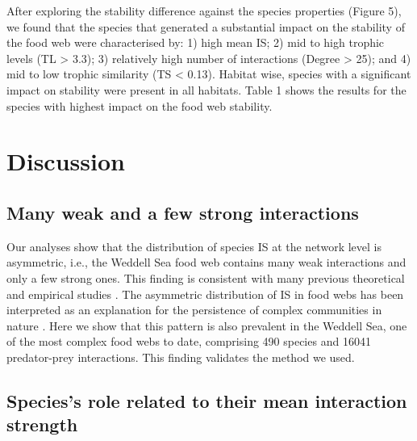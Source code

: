 \documentclass[gc, manuscript]{copernicus}
\begin{document}
After exploring the stability difference against the species properties
(Figure 5), we found that the species that generated a substantial
impact on the stability of the food web were characterised by: 1) high
mean IS; 2) mid to high trophic levels (TL \textgreater{} 3.3); 3)
relatively high number of interactions (Degree \textgreater{} 25); and
4) mid to low trophic similarity (TS \textless{} 0.13). Habitat wise,
species with a significant impact on stability were present in all
habitats. Table 1 shows the results for the species with highest impact
on the food web stability.

\section{Discussion}

\subsection{Many weak and a few strong interactions}

Our analyses show that the distribution of species IS at the network
level is asymmetric, i.e., the Weddell Sea food web contains many weak
interactions and only a few strong ones. This finding is consistent with
many previous theoretical and empirical studies
\citep[e.g.][]{McCann1998, Neutel2002, Emmerson2004, Wootton2005, Kortsch2021}.
The asymmetric distribution of IS in food webs has been interpreted as
an explanation for the persistence of complex communities in nature
\citep{Bascompte2005, Allesina2015, Nilsson2016}. Here we show that this
pattern is also prevalent in the Weddell Sea, one of the most complex
food webs to date, comprising 490 species and 16041 predator-prey
interactions. This finding validates the method we used.

\subsection{Species's role related to their mean interaction strength}
\end{document}
